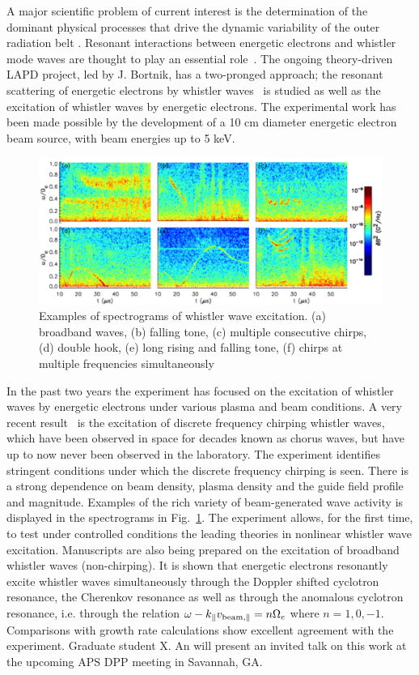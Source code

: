 \documentclass[11pt]{article}
\renewcommand{\cite}{\citep}
\begin{document}
A major scientific problem of current interest is the determination of
the dominant physical processes that drive the dynamic variability of
the outer radiation belt \cite{thorne:2010, reeves:2013}. Resonant interactions between
energetic electrons and whistler mode waves are thought to play an
essential role~\cite{horne:2005, thorne:2013}. The ongoing theory-driven
LAPD project, led by J. Bortnik, has a two-pronged approach; the
resonant scattering of energetic electrons by whistler waves~\cite{vancompernolle:2014} is studied as well as the excitation of
whistler waves by energetic electrons. The experimental work has been
made possible by the development of a 10 cm diameter energetic electron
beam source, with beam energies up to 5 keV.

\begin{figure}[!htbp]
\centerline{\includegraphics[width=5.0truein]{bortnik1}}
\caption{Examples of spectrograms of whistler wave excitation. (a)
  broadband waves, (b) falling tone, (c) multiple consecutive chirps,
  (d) double hook, (e) long rising and falling tone, (f) chirps at
  multiple frequencies simultaneously}\label{bortnik1}
\end{figure}


In the past two years the experiment has focused on the excitation of
whistler waves by energetic electrons under various plasma and beam
conditions. A very recent result~\cite{vancompernolle:2015a} is the excitation
of discrete frequency chirping whistler waves, which have been observed
in space for decades known as chorus waves, but have up to now never
been observed in the laboratory. The experiment identifies stringent
conditions under which the discrete frequency chirping is seen. There is
a strong dependence on beam density, plasma density and the guide field
profile and magnitude. Examples of the rich variety of beam-generated
wave activity is displayed in the spectrograms in Fig.~\ref{bortnik1}. The
experiment allows, for the first time, to test under controlled
conditions the leading theories in nonlinear whistler wave excitation.
Manuscripts are also being prepared on the excitation of broadband
whistler waves (non-chirping). It is shown that energetic electrons
resonantly excite whistler waves simultaneously through the Doppler
shifted cyclotron resonance, the Cherenkov resonance as well as through
the anomalous cyclotron resonance, i.e. through the relation $\omega -
k_\parallel v_{{\rm beam}, \parallel} = n\Omega_{e}$ where
$n=1,0,-1$. Comparisons with
growth rate calculations show excellent agreement with the
experiment.  Graduate student X. An will present an invited talk on
this work at the upcoming APS DPP meeting in Savannah, GA.
\end{document}
